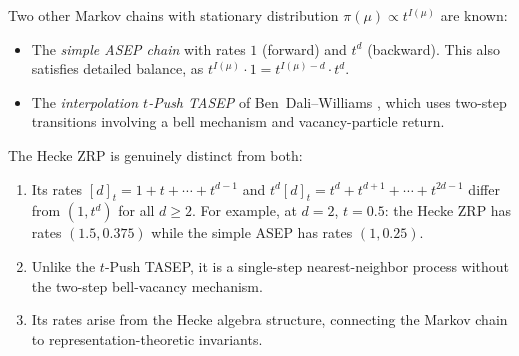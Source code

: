 \begin{remark}
\label{rem:p3-comparison}
Two other Markov chains with stationary distribution
$\pi(\mu) \propto t^{I(\mu)}$ are known:
\begin{itemize}
\item The \emph{simple ASEP chain} with rates $1$ (forward) and $t^d$
  (backward). This also satisfies detailed balance, as
  $t^{I(\mu)} \cdot 1 = t^{I(\mu)-d} \cdot t^d$.
\item The \emph{interpolation $t$-Push TASEP} of Ben~Dali--Williams
  \cite{BDW25}, which uses two-step transitions involving a bell
  mechanism and vacancy-particle return.
\end{itemize}
The Hecke ZRP is genuinely distinct from both:
\begin{enumerate}
\item Its rates $[d]_t = 1 + t + \cdots + t^{d-1}$ and
  $t^d [d]_t = t^d + t^{d+1} + \cdots + t^{2d-1}$ differ from
  $(1, t^d)$ for all $d \geq 2$.
  For example, at $d = 2$, $t = 0.5$: the Hecke ZRP has rates
  $(1.5, 0.375)$ while the simple ASEP has rates $(1, 0.25)$.
\item Unlike the $t$-Push TASEP, it is a single-step
  nearest-neighbor process without the two-step bell-vacancy mechanism.
\item Its rates arise from the Hecke algebra structure, connecting
  the Markov chain to representation-theoretic invariants.
\end{enumerate}
\end{remark}

